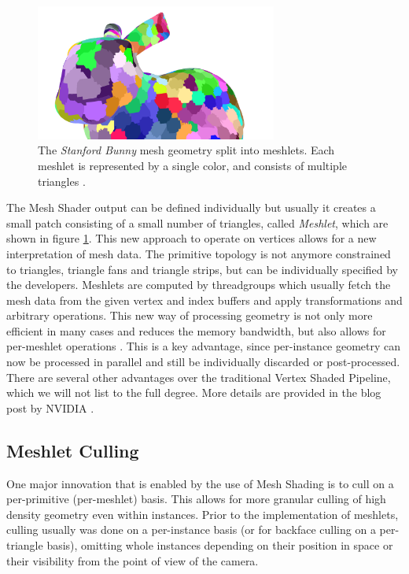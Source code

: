 \begin{figure}[h]
    \centering
    \includegraphics[width=300px]{images/graphics/bunny-meshlet.png}
    \caption{The \emph{Stanford Bunny} mesh geometry split into meshlets. Each meshlet is represented by a single color, 
    and consists of multiple triangles \cite{Oberberger2024}.}
    \label{fig:bunny-meshlet}
\end{figure}

\noindent
The Mesh Shader output can be defined individually but usually it creates a small patch consisting of a small 
number of triangles, called \emph{Meshlet}, which are shown in figure \ref{fig:bunny-meshlet}. This new approach 
to operate on vertices allows for a new interpretation of mesh data. The primitive topology is not anymore constrained 
to triangles, triangle fans and triangle strips, but can be individually specified by the developers.
Meshlets are computed by threadgroups which usually fetch the mesh data from the given vertex and index buffers and 
apply transformations and arbitrary operations. This new way of processing geometry is not only more efficient in many 
cases and reduces the memory bandwidth, but also allows for per-meshlet operations \cite{Kubisch2020}. This is a key 
advantage, since per-instance geometry can now be processed in parallel and still be individually discarded or post-processed. 
There are several other advantages over the traditional Vertex Shaded Pipeline, which we will not list to the full 
degree. More details are provided in the blog post by NVIDIA \cite{Kubisch2020}.\\


\subsection{Meshlet Culling} \label{subsec-meshlet-culling}

One major innovation that is enabled by the use of Mesh Shading is to cull on a per-primitive (per-meshlet) basis. 
This allows for more granular culling of high density geometry even within instances. Prior to the implementation 
of meshlets, culling usually was done on a per-instance basis (or for backface culling on a per-triangle basis), 
omitting whole instances depending on their position in space or their visibility from the point of view of the camera.\\

